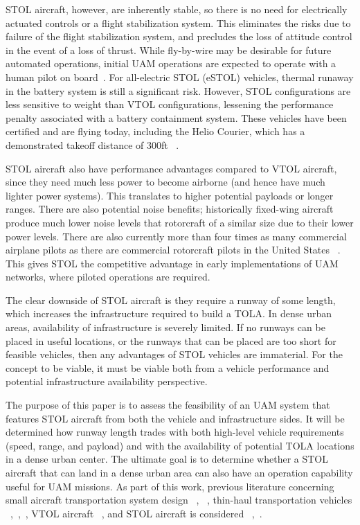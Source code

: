 \documentclass[]{aiaa-tc}%
\begin{document}
STOL aircraft, however, are inherently stable, so there is no need for electrically actuated controls or a flight stabilization system.  This eliminates the risks due to failure of the flight stabilization system, and precludes the loss of attitude control in the event of a loss of thrust.  While fly-by-wire may be desirable for future automated operations, initial UAM operations are expected to operate with a human pilot on board~\cite{Uber}. For all-electric STOL (eSTOL) vehicles, thermal runaway in the battery system is still a significant risk.  However, STOL configurations are less sensitive to weight than VTOL configurations, lessening the performance penalty associated with a battery containment system.  These vehicles have been certified and are flying today, including the Helio Courier, which has a demonstrated takeoff distance of 300ft ~\cite{Rucker}.

STOL aircraft also have performance advantages compared to VTOL aircraft, since they need much less power to become airborne (and hence have much lighter power systems).  This translates to higher potential payloads or longer ranges. There are also potential noise benefits;  historically fixed-wing aircraft produce much lower noise levels that rotorcraft of a similar size due to their lower power levels.  There are also currently more than four times as many commercial airplane pilots as there are commercial rotorcraft pilots in the United States ~\cite{Airmen}. This gives STOL the competitive advantage in early implementations of UAM networks, where piloted operations are required.  

The clear downside of STOL aircraft is they require a runway of some length, which increases the infrastructure required to build a TOLA.  In dense urban areas, availability of infrastructure is severely limited.  If no runways can be placed in useful locations, or the runways that can be placed are too short for feasible vehicles, then any advantages of STOL vehicles are immaterial.  For the concept to be viable, it must be viable both from a vehicle performance and potential infrastructure availability perspective. 

The purpose of this paper is to assess the feasibility of an UAM system that features STOL aircraft from both the vehicle and infrastructure sides.  It will be determined how runway length trades with both high-level vehicle requirements (speed, range, and payload) and with the availability of potential TOLA locations in a dense urban center.  The ultimate goal is to determine whether a STOL aircraft that can land in a dense urban area can also have an operation capability useful for UAM missions. As part of this work, previous literature concerning small aircraft transportation system design ~\cite{Viken}, ~\cite{Holmes}, thin-haul transportation vehicles ~\cite{Harish},~\cite{Kreimeier},~\cite{Justin}, VTOL aircraft ~\cite{Duffy}, and STOL aircraft is considered ~\cite{Antcliff},~\cite{SeeleyIV}. 
 
\end{document}
